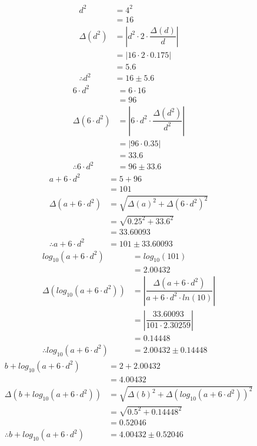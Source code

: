 \documentclass[a4paper]{article}
\begin{document}
\begin{align*}
d ^ { 2 } &= 4 ^ { 2 } \\
&= 16 \\[4mm]
\Delta \left( d ^ { 2 } \right) &= \left| d ^ { 2 } \cdot 2 \cdot \dfrac{ \Delta \left( d \right) }{ d } \right| \\
&= \left| 16 \cdot 2 \cdot 0.175 \right| \\
&= 5.6\\[4mm]
\therefore d ^ { 2 } &= 16 \pm 5.6
\end{align*}
\begin{align*}
6 \cdot d ^ { 2 } &= 6 \cdot 16 \\
&= 96 \\[4mm]
\Delta \left( 6 \cdot d ^ { 2 } \right) &= \left| 6 \cdot d ^ { 2 } \cdot \dfrac{ \Delta \left( d ^ { 2 } \right) }{ d ^ { 2 } } \right| \\
&= \left| 96 \cdot 0.35 \right| \\
&= 33.6\\[4mm]
\therefore 6 \cdot d ^ { 2 } &= 96 \pm 33.6
\end{align*}
\begin{align*}
a + 6 \cdot d ^ { 2 } &= 5 + 96 \\
&= 101 \\[4mm]
\Delta \left( a + 6 \cdot d ^ { 2 } \right) &= \sqrt{ \Delta \left( a \right) ^ { 2 } + \Delta \left( 6 \cdot d ^ { 2 } \right) ^ { 2 }} \\
&= \sqrt{ 0.25 ^ { 2 } + 33.6 ^ { 2 }} \\
&= 33.60093\\[4mm]
\therefore a + 6 \cdot d ^ { 2 } &= 101 \pm 33.60093
\end{align*}
\begin{align*}
log_{ 10 }\left( a + 6 \cdot d ^ { 2 } \right) &= log_{ 10 }\left( 101 \right) \\
&= 2.00432 \\[4mm]
\Delta \left( log_{ 10 }\left( a + 6 \cdot d ^ { 2 } \right) \right) &= \left| \dfrac{ \Delta \left( a + 6 \cdot d ^ { 2 } \right) }{ a + 6 \cdot d ^ { 2 } \cdot ln \left( 10 \right) } \right| \\
&= \left| \dfrac{ 33.60093 }{ 101 \cdot 2.30259 } \right| \\
&= 0.14448\\[4mm]
\therefore log_{ 10 }\left( a + 6 \cdot d ^ { 2 } \right) &= 2.00432 \pm 0.14448
\end{align*}
\begin{align*}
b + log_{ 10 }\left( a + 6 \cdot d ^ { 2 } \right) &= 2 + 2.00432 \\
&= 4.00432 \\[4mm]
\Delta \left( b + log_{ 10 }\left( a + 6 \cdot d ^ { 2 } \right) \right) &= \sqrt{ \Delta \left( b \right) ^ { 2 } + \Delta \left( log_{ 10 }\left( a + 6 \cdot d ^ { 2 } \right) \right) ^ { 2 }} \\
&= \sqrt{ 0.5 ^ { 2 } + 0.14448 ^ { 2 }} \\
&= 0.52046\\[4mm]
\therefore b + log_{ 10 }\left( a + 6 \cdot d ^ { 2 } \right) &= 4.00432 \pm 0.52046
\end{align*}
\end{document}
